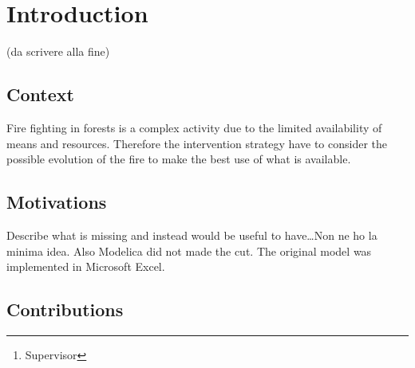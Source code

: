\documentclass[draft]{article}
\title{\mytitle}
\date{2021}
\author{Diego Bellani\and Enrico Tronci\thanks{Supervisor}}
\begin{document}
\begin{titlepage}
	\maketitle

	\begin{abstract}
	(Max one page, da scrivere alla fine)
	\end{abstract}

	\iffalse
	\tableofcontents
	\listoffigures
	\listoftables
	\fi
\end{titlepage}


\section{Introduction}\label{sec:intro}

(da scrivere alla fine)

\subsection{Context}\label{sec:context}

Fire fighting in forests is a complex activity due to the limited availability
of means and resources. Therefore the intervention strategy have to consider the
possible evolution of the fire to make the best use of what is available.

\iffalse
Lo spegnimento di un incendio boschivo è un attività complessa poichè, essendo
la disponibilità di mezzi e risorse limitata, la strategia di intervento deve in
qualche modo tenere in conto dell'evoluzione possibile dell'incendio in modo da
utilizzare la meglio le risorse disponibili.
\fi

\subsection{Motivations}\label{sec:motivations}

Describe what is missing and instead would be useful to have\dots Non ne ho la
minima idea. Also Modelica did not made the cut. The original model was
implemented in Microsoft Excel\texttrademark.

\subsection{Contributions}\label{sec:contrib}
\end{document}
